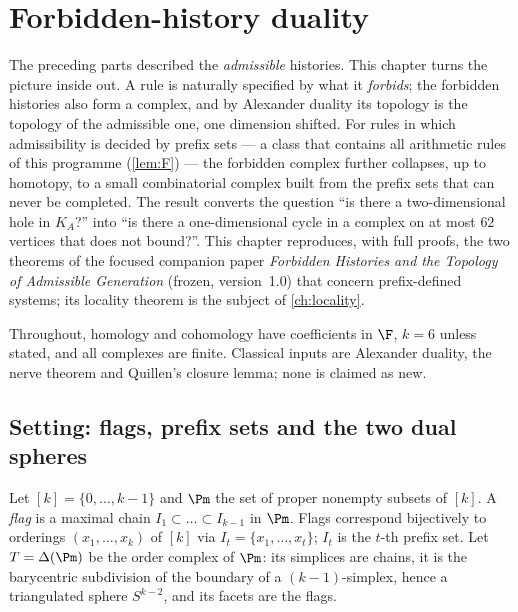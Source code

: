\chapter{Forbidden-history duality}\label{ch:duality}

The preceding parts described the \emph{admissible} histories. This chapter turns the picture inside out. A rule is naturally specified by what it \emph{forbids}; the forbidden histories also form a complex, and by Alexander duality its topology is the topology of the admissible one, one dimension shifted. For rules in which admissibility is decided by prefix sets --- a class that contains all arithmetic rules of this programme (\cref{lem:F}) --- the forbidden complex further collapses, up to homotopy, to a small combinatorial complex built from the prefix sets that can never be completed. The result converts the question ``is there a two-dimensional hole in $K_A$?'' into ``is there a one-dimensional cycle in a complex on at most $62$ vertices that does not bound?''. This chapter reproduces, with full proofs, the two theorems of the focused companion paper \emph{Forbidden Histories and the Topology of Admissible Generation} (frozen, version~1.0) that concern prefix-defined systems; its locality theorem is the subject of \cref{ch:locality}.

Throughout, homology and cohomology have coefficients in $\F$, $k=6$ unless stated, and all complexes are finite. Classical inputs are Alexander duality, the nerve theorem and Quillen's closure lemma; none is claimed as new.

\section{Setting: flags, prefix sets and the two dual spheres}\label{sec:flags}
Let $[k]=\{0,\dots,k-1\}$ and $\Pm$ the set of proper nonempty subsets of $[k]$. A \emph{flag} is a maximal chain $I_1\subset\dots\subset I_{k-1}$ in $\Pm$. Flags correspond bijectively to orderings $(x_1,\dots,x_k)$ of $[k]$ via $I_t=\{x_1,\dots,x_t\}$; $I_t$ is the $t$-th prefix set. Let $T=\Delta(\Pm)$ be the order complex of $\Pm$: its simplices are chains, it is the barycentric subdivision of the boundary of a $(k{-}1)$-simplex, hence a triangulated sphere $S^{k-2}$, and its facets are the flags.

